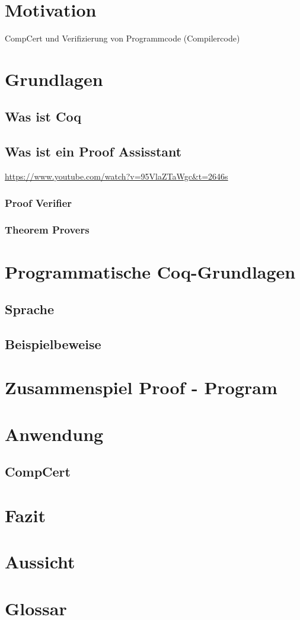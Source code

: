 \section{Motivation}
CompCert und Verifizierung von Programmcode (Compilercode)

\section{Grundlagen}
\subsection{Was ist Coq}
\subsection{Was ist ein Proof Assisstant}
\url{https://www.youtube.com/watch?v=95VlaZTaWgc&t=2646s}
\subsubsection{Proof Verifier}
\subsubsection{Theorem Provers}

\section{Programmatische Coq-Grundlagen}
\subsection{Sprache}
\subsection{Beispielbeweise}

\section{Zusammenspiel Proof - Program}

\section{Anwendung}
\subsection{CompCert}

\section{Fazit}
\section{Aussicht}

\section{Glossar}


